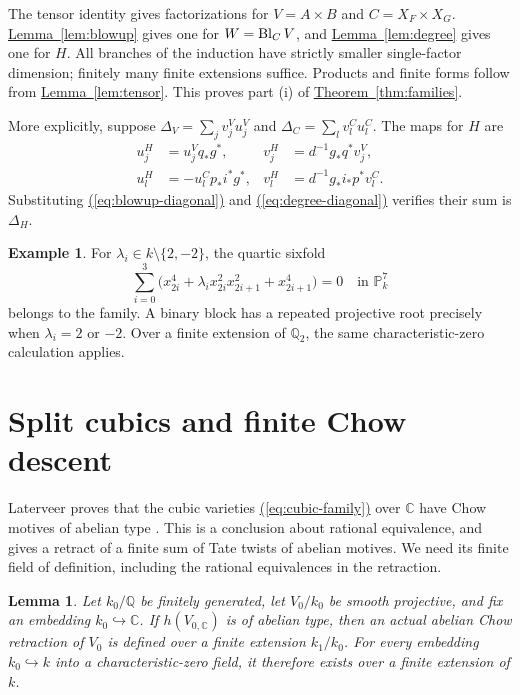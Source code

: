 \documentclass[11pt,a4paper]{article}
\newtheorem{lemma}[theorem]{Lemma}
\theoremstyle{definition}
\newtheorem{example}[theorem]{Example}
\theoremstyle{remark}\newtheorem{remark}[theorem]{Remark}
\numberwithin{equation}{section}
\newcommand{\Q}{\mathbb Q}\newcommand{\R}{\mathbb R}\newcommand{\C}{\mathbb C}
\newcommand{\PP}{\mathbb P}\newcommand{\LL}{\mathbb L}
\newcommand{\thmref}[1]{\hyperref[#1]{\textcolor{resultlink}{Theorem~\ref*{#1}}}}
\newcommand{\lemref}[1]{\hyperref[#1]{\textcolor{resultlink}{Lemma~\ref*{#1}}}}
\renewcommand{\eqref}[1]{\hyperref[#1]{\textcolor{equationlink}{(\ref*{#1})}}}
\begin{document}
The tensor identity gives factorizations for $V=A\times B$ and
$C=X_F\times X_G$. \lemref{lem:blowup} gives one for $W=\operatorname{Bl}_CV$,
and \lemref{lem:degree} gives one for $H$. All branches of the
induction have strictly smaller single-factor dimension; finitely
many finite extensions suffice. Products and finite forms follow
from \lemref{lem:tensor}. This proves part (i) of
\thmref{thm:families}.

More explicitly, suppose
$\Delta_V=\sum_jv_j^Vu_j^V$ and $\Delta_C=\sum_l v_l^Cu_l^C$.
The maps for $H$ are
\begin{align}
 u_j^H&=u_j^Vq_*g^*,& v_j^H&=d^{-1}g_*q^*v_j^V,\label{eq:ambient-recursion}\\
 u_l^H&=-u_l^Cp_*i^*g^*,& v_l^H&=d^{-1}g_*i_*p^*v_l^C.
 \label{eq:center-recursion}
\end{align}
Substituting \eqref{eq:blowup-diagonal} and
\eqref{eq:degree-diagonal} verifies their sum is $\Delta_H$.

\begin{example}\label{ex:quartic-sixfold}
For $\lambda_i\in k\setminus\{2,-2\}$, the quartic sixfold
\[
 \sum_{i=0}^{3}
 \bigl(x_{2i}^4+\lambda_i x_{2i}^2x_{2i+1}^2+x_{2i+1}^4\bigr)=0
       \quad\text{in }\PP^7_k
\]
belongs to the family. A binary block has a repeated projective
root precisely when $\lambda_i=2$ or $-2$. Over a finite extension
of $\Q_2$, the same characteristic-zero calculation applies.
\end{example}

\section{Split cubics and finite Chow descent}\label{sec:cubic}

Laterveer proves that the cubic varieties
\eqref{eq:cubic-family} over $\C$ have Chow motives of abelian
type \cite[Theorem 5]{Laterveer}. This is a conclusion about
rational equivalence, and gives a retract of a finite sum of
Tate twists of abelian motives. We need its finite field of
definition, including the rational equivalences in the retraction.

\begin{lemma}\label{lem:descent}
Let $k_0/\Q$ be finitely generated, let $V_0/k_0$ be smooth
projective, and fix an embedding $k_0\hookrightarrow\C$.
If $h(V_{0,\C})$ is of abelian type, then an actual abelian
Chow retraction of $V_0$ is defined over a finite extension
$k_1/k_0$. For every embedding $k_0\hookrightarrow k$ into
a characteristic-zero field, it therefore exists over a finite
extension of $k$.
\end{lemma}
\end{document}
